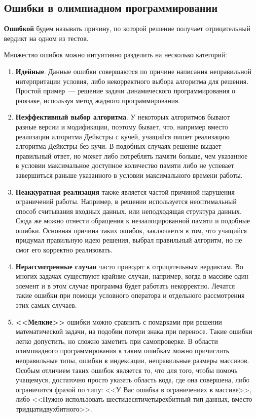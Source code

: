 \subsection{Ошибки в олимпиадном программировании}

\textbf{Ошибкой} будем называть причину, по которой решение получает отрицательный вердикт на одном из тестов.

Множество ошибок можно интуитивно разделить на несколько категорий:
\begin{enumerate}
    \item \textbf{Идейные}. Данные ошибки совершаются по причине написания неправильной интерпритации условия,
        либо некорректного выбора алгоритма для решения. Простой пример~--- решение задачи динамического программирования 
        о рюкзаке, используя метод жадного программирования. 
    \item \textbf{Неэффективный выбор алгоритма}. У некоторых алгоритмов бывают разные версии и модификации,
        поэтому бывает, что, например вместо реализации алгоритма Дейкстры с кучей, учащийся пишет 
        реализацию алгоритма Дейкстры без кучи. В подобных случаях решение выдает правильный ответ, но может
        либо потреблять памяти больше, чем указанное в условии максимальное доступное количество памяти
        либо не успевает завершиться раньше указанного в условии максимального времени работы.
    \item \textbf{Неаккуратная реализация} также является частой причиной нарушения ограничений работы.
        Например, в решении используется неоптимальный способ считывания входных данных, или неподходящая
        структура данных. Сюда же можно отнести обращения к незаалоцированной памяти и подобные ошибки.
        Основная причина таких ошибок, заключается в том, что учащийся придумал правильную идею решения, 
        выбрал правильный алгоритм, но не смог его корректно реализовать.  
    \item \textbf{Нерассмотренные случаи} часто приводят к отрицательным вердиктам. Во многих задачах существуют крайние случаи,
        например, когда в массиве один элемент и в этом случае программа будет работать некорректно. Лечатся такие ошибки при помощи
        условного оператора и отдельного рассмотрения этих самых случаев.
    \item \textbf{<<Мелкие>>} ошибки можно сравнить с помарками при решении математической задачи, на подобии потери знака при переносе.
        Такие ошибки легко допустить, но сложно заметить при самопроверке. В области олимпиадного программирования к таким ошибкам
        можно причислить неправильные типы, ошибки в индексации, неправильные размеры массивов. Особым отличием таких ошибок
        является то, что для того, чтобы помочь учащемуся, достаточно просто указать область кода, где она совершена, либо
        ограничится фразой по типу: <<У Вас ошибка в ограничениях в массиве>>, либо <<Нужно использовать 
        шестидесятичетырехбитный тип данных, вместо тридцатидвухбитного>>.   
\end{enumerate}


